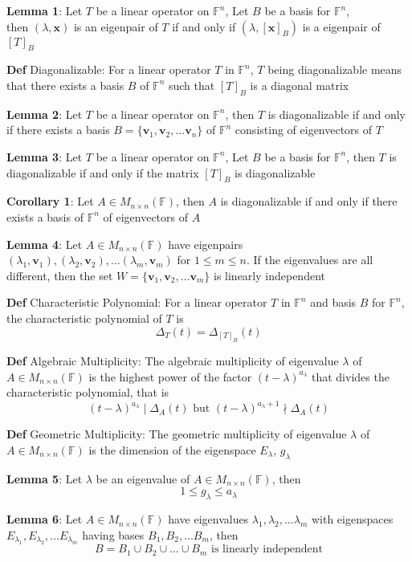 \documentclass[11pt,notitlepage]{report}
\newcommand{\bb}[1]{\ensuremath{\mathbb{#1}}}
\newcommand{\tbf}[1]{\textbf{#1}}
\begin{document}
\textbf{Lemma 1}: Let $T$ be a linear operator on $\bb F^n$, Let $B$ be a basis for $\bb F^n$,\\
then
$(\lambda, \tbf x)$ is an eigenpair of $T$ if and only if $(\lambda, [\tbf x]_B)$ is a eigenpair of $[T]_B$

\textbf{Def} Diagonalizable: For a linear operator $T$ in $\bb F^n$, $T$ being diagonalizable means that there exists a basis $B$ of $\bb F^n$ such that $[T]_B$ is a diagonal matrix

\textbf{Lemma 2}: Let $T$ be a linear operator on $\bb F^n$, then $T$ is diagonalizable if and only if there exists a basis $B = \{\tbf v_1, \tbf v_2, \dots \tbf v_n\}$ of $\bb F^n$ consisting of eigenvectors of $T$

\textbf{Lemma 3}: Let $T$ be a linear operator on $\bb F^n$, Let $B$ be a basis for $\bb F^n$, then $T$ is diagonalizable if and only if the matrix $[T]_B$ is diagonalizable

\textbf{Corollary 1}: Let $A \in M_{n \times n}(\bb F)$, then $A$ is diagonalizable if and only if there exists a basis of $\bb F^n$ of eigenvectors of $A$

\textbf{Lemma 4}: Let $A \in M_{n \times n}(\bb F)$ have eigenpairs $(\lambda_1, \tbf v_1), (\lambda_2, \tbf v_2), \dots (\lambda_m, \tbf v_m)$ for $1 \leq m \leq n$. If the eigenvalues are all different, then the set $W = \{\tbf v_1, \tbf v_2, \dots \tbf v_m\}$ is linearly independent

\textbf{Def} Characteristic Polynomial: For a linear operator $T$ in $\bb F^n$ and basis $B$ for $\bb F^n$, the characteristic polynomial of $T$ is
$$\Delta_T(t) = \Delta_{[T]_B}(t)$$

\textbf{Def} Algebraic Multiplicity: The algebraic multiplicity of eigenvalue $\lambda$ of $A \in M_{n \times n}(\bb F)$ is the highest power of the factor $(t - \lambda)^{a_\lambda}$ that divides the characteristic polynomial, that is
$$(t-\lambda)^{a_\lambda} \mid \Delta_A(t) \text{ but } (t-\lambda)^{a_\lambda + 1} \nmid \Delta_A(t)$$

\textbf{Def} Geometric Multiplicity: The geometric multiplicity of eigenvalue $\lambda$ of $A \in M_{n \times n}(\bb F)$ is the dimension of the eigenspace $E_\lambda$, $g_\lambda$ 

\textbf{Lemma 5}: Let $\lambda$ be an eigenvalue of $A \in M_{n \times n}(\bb F)$, then
$$1 \leq g_\lambda \leq a_\lambda$$

\textbf{Lemma 6}: Let $A \in M_{n \times n}(\bb F)$ have eigenvalues $\lambda_1, \lambda_2, \dots \lambda_m$ with eigenspaces $E_{\lambda_1}, E_{\lambda_2}, \dots E_{\lambda_m}$ having bases $B_1, B_2, \dots B_m$, then
$$B= B_1 \cup B_2 \cup \dots \cup B_m \text{ is linearly independent}$$
\end{document}

